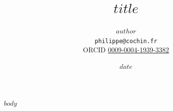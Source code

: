 \documentclass[12pt]{article}
\title{$title$}
\author{$author$ \\ \texttt{philippe@cochin.fr} \\
  \small ORCID \href{https://orcid.org/0009-0004-1939-3382}{0009-0004-1939-3382}}
\date{$date$}
\begin{document}
\maketitle
$body$
\end{document}
